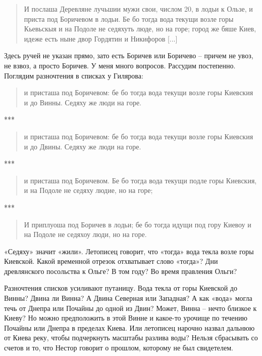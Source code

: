 \begin{quotation}
И послаша Деревляне лучьшии мужи свои, числом 20, в лодьи к Ользе, и приста под Боричевом в лодьи. Бе бо тогда вода текущи возле горы Кьевьскыя и на Подоле не седяхуть люде, но на горе; город же бяше Киев, идеже есть ныне двор Гордятин и Никифоров [...]
\end{quotation}

Здесь ручей не указан прямо, зато есть Боричев или Боричево – причем не увоз, не взвоз, а просто Боричев. У меня много вопросов. Рассудим постепенно. Поглядим разночтения в списках у Гилярова:

\begin{quotation}
и присташа под Боричевом: бе бо тогда вода текущи возле горы Киевския и до Винны. Седяху же люди на горе.
\end{quotation}

\begin{center}***\end{center}

\begin{quotation}
и присташа под Боричевом: бе бо тогда вода текущи возле горы Киевския и до Двины. Седяху же люди на горе.
\end{quotation}

\begin{center}***\end{center}

\begin{quotation}
и присташа под Боричевом. Бе бо тогда вода текущи подле горы Киевския, и на Подоле не седяху людие, но на горе;
\end{quotation}

\begin{center}***\end{center}

\begin{quotation}
И приплуоша под Боричев в лодьи; бе бо тогда идущи под гору Киевоу и на Подоле не седяхоу люди, но на горе.
\end{quotation}

«Седяху» значит «жили». Летописец говорит, что «тогда» вода текла возле горы Киевской. Какой временной отрезок отхватывает слово «тогда»? Дни древлянского посольства к Ольге? В том году? Во время правления Ольги?

Разночтения списков усиливают путаницу. Вода текла от горы Киевской до Винны? Двина ли Винна? А Двина Северная или Западная? А как «вода» могла течь от Днепра или Почайны до одной из Двин? Может, Винна – нечто близкое к Киеву? Но можно предположить в этой Винне и какое-то урочище по течению Почайны или Днепра в пределах Киева. Или летописец нарочно назвал дальнюю от Киева реку, чтобы подчеркнуть масштабы разлива воды? Нельзя сбрасывать со счетов и то, что Нестор говорит о прошлом, которому не был свидетелем.


